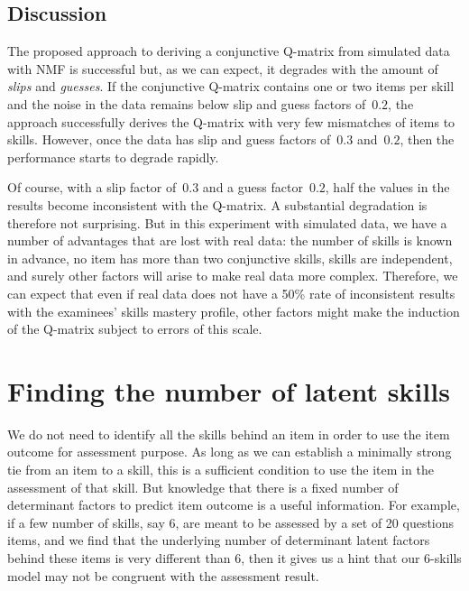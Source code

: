 \subsection{Discussion}

The proposed approach to deriving a conjunctive Q-matrix from simulated data with NMF is successful but, as we can expect, it degrades with the amount of \textit{slips} and \textit{guesses}. If the conjunctive Q-matrix contains one or two items per skill and the noise in the data remains below slip and guess factors of~$0.2$, the approach successfully derives the Q-matrix with very few mismatches of items to skills.  However, once the data has slip and guess factors of~$0.3$ and~$0.2$, then the performance starts to degrade rapidly.

Of course, with a slip factor of~$0.3$ and a guess factor~$0.2$, half the values in the results become inconsistent with the Q-matrix. A substantial degradation is therefore not surprising.  But in this experiment with simulated data, we have a number of advantages that are lost with real data: the number of skills is known in advance, no item has more than two conjunctive skills, skills are independent, and surely other factors will arise to make real data more complex.  Therefore, we can expect that even if real data does not have a 50\% rate of inconsistent results with the examinees' skills mastery profile, other factors might make the induction of the Q-matrix subject to errors of this scale.

\section{Finding the number of latent skills}
\label{EDM2012}

We do not need to identify all the skills behind an item in order to use the item outcome for assessment purpose. As long as we can establish a minimally strong tie from an item to a skill, this is a sufficient condition to use the item in the assessment of that skill. But knowledge that there is a fixed number of determinant factors to predict item outcome is a useful information. For example, if a few number of skills, say 6, are meant to be assessed by a set of 20 questions items, and we find that the underlying number of determinant latent factors behind these items is very different than 6, then it gives us a hint that our 6-skills model may not be congruent with the assessment result.


